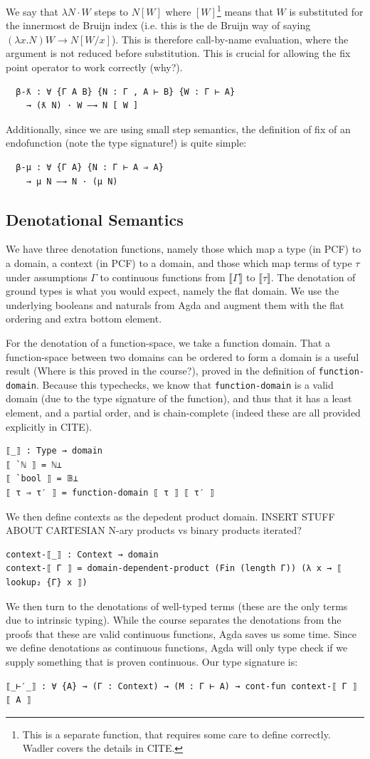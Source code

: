 \documentclass[12pt,a4paper,twoside,openright]{report}
\begin{document}
We say that $\lambda N \cdot W$ steps to $N [W]$ where $[W]$\footnote{This is a separate function, that requires some care to define correctly. Wadler covers the details in CITE.} means that $W$ is substituted for the innermost de Bruijn index (i.e. this is the de Bruijn way of saying $(\lambda x. N) W \to N[W/x]$). This is therefore call-by-name evaluation, where the argument is not reduced before substitution. This is crucial for allowing the fix point operator to work correctly (why?). 
\begin{verbatim}
  β-ƛ : ∀ {Γ A B} {N : Γ , A ⊢ B} {W : Γ ⊢ A}
    → (ƛ N) · W —→ N [ W ]
\end{verbatim}
Additionally, since we are using small step semantics, the definition of fix of an endofunction (note the type signature!) is quite simple:
\begin{verbatim}
  β-μ : ∀ {Γ A} {N : Γ ⊢ A ⇒ A}
    → μ N —→ N · (μ N)
\end{verbatim}
\subsection{Denotational Semantics}
We have three denotation functions, namely those which map a type (in PCF) to a domain, a context (in PCF) to a domain, and those which map terms of type $\tau$ under assumptions $\Gamma$ to continuous functions from $\llbracket \Gamma \rrbracket$ to $\llbracket \tau \rrbracket$. The denotation of ground types is what you would expect, namely the flat domain. We use the underlying booleans and naturals from Agda and augment them with the flat ordering and extra bottom element. 

For the denotation of a function-space, we take a function domain. That a function-space between two domains can be ordered to form a domain is a useful result (Where is this proved in the course?), proved in the definition of \texttt{function-domain}. Because this typechecks, we know that \texttt{function-domain} is a valid domain (due to the type signature of the function), and thus that it has a least element, and a partial order, and is chain-complete (indeed these are all provided explicitly in CITE). 
\begin{verbatim}
⟦_⟧ : Type → domain
⟦ `ℕ ⟧ = ℕ⊥
⟦ `bool ⟧ = 𝔹⊥
⟦ τ ⇒ τ′ ⟧ = function-domain ⟦ τ ⟧ ⟦ τ′ ⟧
\end{verbatim}
We then define contexts as the depedent product domain. INSERT STUFF ABOUT CARTESIAN N-ary products vs binary products iterated?
\begin{verbatim}
context-⟦_⟧ : Context → domain
context-⟦ Γ ⟧ = domain-dependent-product (Fin (length Γ)) (λ x → ⟦ lookup₂ {Γ} x ⟧)
\end{verbatim}
We then turn to the denotations of well-typed terms (these are the only terms due to intrinsic typing). While the course separates the denotations from the proofs that these are valid continuous functions, Agda saves us some time. Since we define denotations as continuous functions, Agda will only type check if we supply something that is proven continuous. Our type signature is:
\begin{verbatim}
⟦_⊢′_⟧ : ∀ {A} → (Γ : Context) → (M : Γ ⊢ A) → cont-fun context-⟦ Γ ⟧ ⟦ A ⟧
\end{verbatim}
\end{document}
